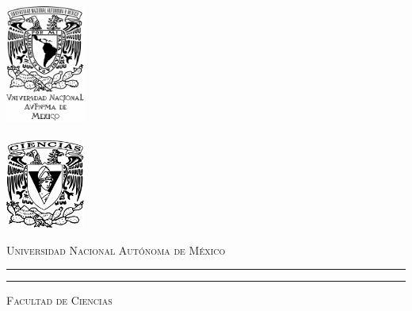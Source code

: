 
\begin{titlepage}
  \vspace*{1.5cm}
  \hskip-0.5cm
  \begin{minipage}[c][10cm][s]{3cm} 
    \begin{center}
      \includegraphics[width=2.6cm]{unamf}\\[10pt]
      \hskip2pt\vrule width2pt height13cm\hskip1mm
      \vrule width1pt height13cm\\[10pt]
      \includegraphics[width=2.6cm]{cienciasf}
    \end{center}
  \end{minipage}\quad
  \begin{minipage}[c][9.5cm][s]{10cm}
    \begin{center}
      {\large \scshape Universidad Nacional Autónoma de México}
      \vspace{.3cm}
      \hrule height2pt
      \vspace{.1cm}
      \hrule height1pt
      \vspace{.3cm}
      {\scshape Facultad de Ciencias}

      \vspace{3cm}

      {\Large \eltitulo}

      \vspace{3cm}


\end{center}
\end{minipage}
\end{titlepage}
